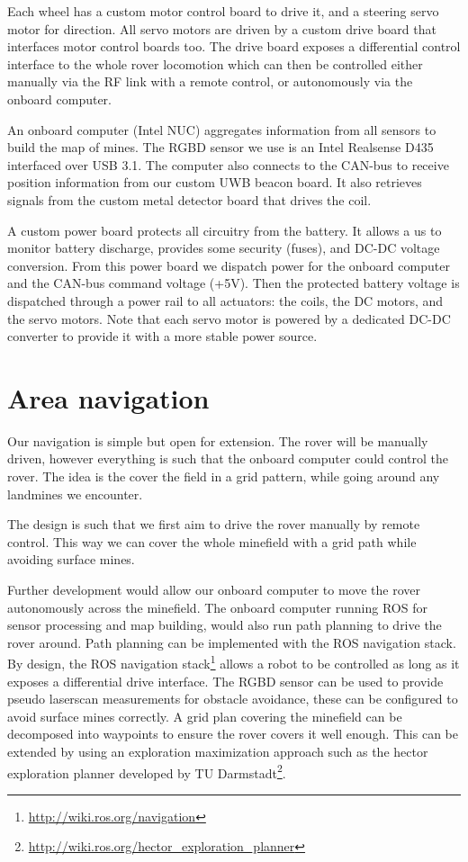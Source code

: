 Each wheel has a custom motor control board to drive it, and a steering servo motor for direction.
All servo motors are driven by a custom drive board that interfaces motor control boards too.
The drive board exposes a differential control interface to the whole rover locomotion which can then be controlled either manually via the RF link with a remote control, or autonomously via the onboard computer.

An onboard computer (Intel NUC) aggregates information from all sensors to build the map of mines.
The RGBD sensor we use is an Intel Realsense D435 interfaced over USB 3.1.
The computer also connects to the CAN-bus to receive position information from our custom UWB beacon board.
It also retrieves signals from the custom metal detector board that drives the coil.

A custom power board protects all circuitry from the battery.
It allows a us to monitor battery discharge, provides some security (fuses), and DC-DC voltage conversion.
From this power board we dispatch power for the onboard computer and the CAN-bus command voltage (+5V).
Then the protected battery voltage is dispatched through a power rail to all actuators: the coils, the DC motors, and the servo motors.
Note that each servo motor is powered by a dedicated DC-DC converter to provide it with a more stable power source.


\section{Area navigation}
Our navigation is simple but open for extension.
The rover will be manually driven, however everything is such that the onboard computer could control the rover.
The idea is the cover the field in a grid pattern, while going around any landmines we encounter.

The design is such that we first aim to drive the rover manually by remote control.
This way we can cover the whole minefield with a grid path while avoiding surface mines.

Further development would allow our onboard computer to move the rover autonomously across the minefield.
The onboard computer running ROS for sensor processing and map building, would also run path planning to drive the rover around.
Path planning can be implemented with the ROS navigation stack.
By design, the ROS navigation stack\footnote{\url{http://wiki.ros.org/navigation}} allows a robot to be controlled as long as it exposes a differential drive interface.
The RGBD sensor can be used to provide pseudo laserscan measurements for obstacle avoidance, these can be configured to avoid surface mines correctly.
A grid plan covering the minefield can be decomposed into waypoints to ensure the rover covers it well enough.
This can be extended by using an exploration maximization approach such as the hector exploration planner developed by TU Darmstadt\footnote{\url{http://wiki.ros.org/hector_exploration_planner}}.

